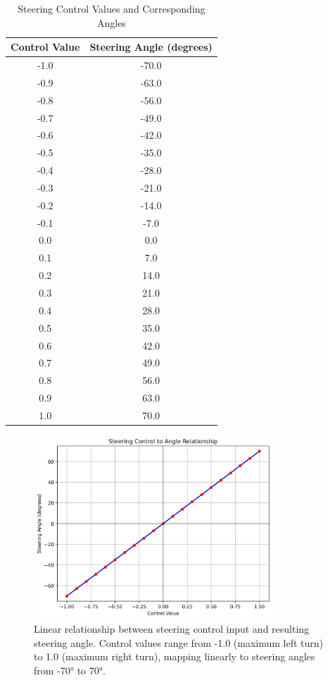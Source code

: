 \begin{table}[h]
\centering
\caption{Steering Control Values and Corresponding Angles}
\begin{tabular}{|c|c|}
\hline
Control Value & Steering Angle (degrees) \\
\hline
 -1.0 &  -70.0 \\
\hline
 -0.9 &  -63.0 \\
\hline
 -0.8 &  -56.0 \\
\hline
 -0.7 &  -49.0 \\
\hline
 -0.6 &  -42.0 \\
\hline
 -0.5 &  -35.0 \\
\hline
 -0.4 &  -28.0 \\
\hline
 -0.3 &  -21.0 \\
\hline
 -0.2 &  -14.0 \\
\hline
 -0.1 &   -7.0 \\
\hline
  0.0 &    0.0 \\
\hline
  0.1 &    7.0 \\
\hline
  0.2 &   14.0 \\
\hline
  0.3 &   21.0 \\
\hline
  0.4 &   28.0 \\
\hline
  0.5 &   35.0 \\
\hline
  0.6 &   42.0 \\
\hline
  0.7 &   49.0 \\
\hline
  0.8 &   56.0 \\
\hline
  0.9 &   63.0 \\
\hline
  1.0 &   70.0 \\
\hline
\end{tabular}
\label{tab:steering_range}
\end{table}

\begin{figure}[h]
    \centering
    \includegraphics[width=0.8\textwidth]{Figures/Methods/steering_relationship.png}
    \caption{Linear relationship between steering control input and resulting steering angle. Control values range from -1.0 (maximum left turn) to 1.0 (maximum right turn), mapping linearly to steering angles from -70° to 70°.}
    \label{fig:steering_relationship}
\end{figure}

